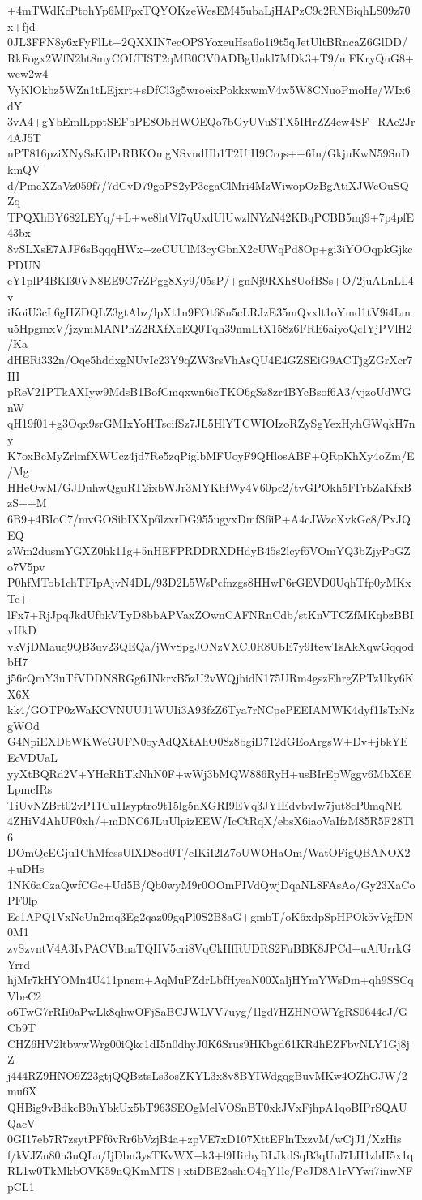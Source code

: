 +4mTWdKcPtohYp6MFpxTQYOKzeWesEM45ubaLjHAPzC9c2RNBiqhLS09z70x+fjd
0JL3FFN8y6xFyFlLt+2QXXIN7ecOPSYoxeuHsa6o1i9t5qJetUltBRncaZ6GlDD/
RkFogx2WfN2ht8myCOLTIST2qMB0CV0ADBgUnkl7MDk3+T9/mFKryQnG8+wew2w4
VyKlOkbz5WZn1tLEjxrt+sDfCl3g5wroeixPokkxwmV4w5W8CNuoPmoHe/WIx6dY
3vA4+gYbEmlLpptSEFbPE8ObHWOEQo7bGyUVuSTX5IHrZZ4ew4SF+RAe2Jr4AJ5T
nPT816pziXNySsKdPrRBKOmgNSvudHb1T2UiH9Crqs++6In/GkjuKwN59SnDkmQV
d/PmeXZaVz059f7/7dCvD79goPS2yP3egaClMri4MzWiwopOzBgAtiXJWcOuSQZq
TPQXhBY682LEYq/+L+we8htVf7qUxdUlUwzlNYzN42KBqPCBB5mj9+7p4pfE43bx
8vSLXsE7AJF6sBqqqHWx+zeCUUlM3cyGbnX2cUWqPd8Op+gi3iYOOqpkGjkcPDUN
eY1plP4BKl30VN8EE9C7rZPgg8Xy9/05sP/+gnNj9RXh8UofBSs+O/2juALnLL4v
iKoiU3cL6gHZDQLZ3gtAbz/lpXt1n9FOt68u5cLRJzE35mQvxlt1oYmd1tV9i4Lm
u5HpgmxV/jzymMANPhZ2RXfXoEQ0Tqh39nmLtX158z6FRE6aiyoQcIYjPVlH2/Ka
dHERi332n/Oqe5hddxgNUvIc23Y9qZW3rsVhAsQU4E4GZSEiG9ACTjgZGrXcr7IH
pReV21PTkAXIyw9MdsB1BofCmqxwn6icTKO6gSz8zr4BYcBsof6A3/vjzoUdWGnW
qH19f01+g3Oqx9srGMIxYoHTscifSz7JL5HlYTCWIOIzoRZySgYexHyhGWqkH7ny
K7oxBcMyZrlmfXWUcz4jd7Re5zqPiglbMFUoyF9QHlosABF+QRpKhXy4oZm/E/Mg
HHeOwM/GJDuhwQguRT2ixbWJr3MYKhfWy4V60pc2/tvGPOkh5FFrbZaKfxBzS++M
6B9+4BIoC7/mvGOSibIXXp6lzxrDG955ugyxDmfS6iP+A4cJWzcXvkGc8/PxJQEQ
zWm2dusmYGXZ0hk11g+5nHEFPRDDRXDHdyB45s2lcyf6VOmYQ3bZjyPoGZo7V5pv
P0hfMTob1chTFIpAjvN4DL/93D2L5WsPcfnzgs8HHwF6rGEVD0UqhTfp0yMKxTc+
lFx7+RjJpqJkdUfbkVTyD8bbAPVaxZOwnCAFNRnCdb/stKnVTCZfMKqbzBBIvUkD
vkVjDMauq9QB3uv23QEQa/jWvSpgJONzVXCl0R8UbE7y9ItewTsAkXqwGqqodbH7
j56rQmY3uTfVDDNSRGg6JNkrxB5zU2vWQjhidN175URm4gszEhrgZPTzUky6KX6X
kk4/GOTP0zWaKCVNUUJ1WUIi3A93fzZ6Tya7rNCpePEEIAMWK4dyf1IsTxNzgWOd
G4NpiEXDbWKWeGUFN0oyAdQXtAhO08z8bgiD712dGEoArgsW+Dv+jbkYEEeVDUaL
yyXtBQRd2V+YHcRIiTkNhN0F+wWj3bMQW886RyH+usBIrEpWggv6MbX6ELpmcIRs
TiUvNZBrt02vP11Cu1Isyptro9t15lg5nXGRI9EVq3JYIEdvbvIw7jut8cP0mqNR
4ZHiV4AhUF0xh/+mDNC6JLuUlpizEEW/IcCtRqX/ebsX6iaoVaIfzM85R5F28Tl6
DOmQeEGju1ChMfcssUlXD8od0T/eIKiI2lZ7oUWOHaOm/WatOFigQBANOX2+uDHs
1NK6aCzaQwfCGc+Ud5B/Qb0wyM9r0OOmPIVdQwjDqaNL8FAsAo/Gy23XaCoPF0lp
Ec1APQ1VxNeUn2mq3Eg2qaz09gqPl0S2B8aG+gmbT/oK6xdpSpHPOk5vVgfDN0M1
zvSzvntV4A3IvPACVBnaTQHV5cri8VqCkHfRUDRS2FuBBK8JPCd+uAfUrrkGYrrd
hjMr7kHYOMn4U411pnem+AqMuPZdrLbfHyeaN00XaljHYmYWsDm+qh9SSCqVbeC2
o6TwG7rRIi0aPwLk8qhwOFjSaBCJWLVV7uyg/1lgd7HZHNOWYgRS0644eJ/GCb9T
CHZ6HV2ltbwwWrg00iQkc1dI5n0dhyJ0K6Srus9HKbgd61KR4hEZFbvNLY1Gj8jZ
j444RZ9HNO9Z23gtjQQBztsLs3osZKYL3x8v8BYIWdgqgBuvMKw4OZhGJW/2mu6X
QHBig9vBdkcB9nYbkUx5bT963SEOgMelVOSnBT0xkJVxFjhpA1qoBIPrSQAUQacV
0GI17eb7R7zsytPFf6vRr6bVzjB4a+zpVE7xD107XttEFlnTxzvM/wCjJ1/XzHis
f/kVJZn80n3uQLu/IjDbn3ysTKvWX+k3+l9HirhyBLJkdSqB3qUul7LH1zhH5x1q
RL1w0TkMkbOVK59nQKmMTS+xtiDBE2ashiO4qY1le/PcJD8A1rVYwi7inwNFpCL1
